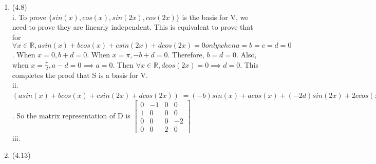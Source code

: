 \documentclass[letterpaper,12pt]{article}
\theoremstyle{definition}
\begin{document}
\begin{enumerate}
	\item(4.8)\\
	i. To prove $\{ sin(x), cos(x), sin(2x), cos(2x) \}$ is the basis for V, we need to prove they are linearly independent. This is equivalent to prove that for $\forall x \in \mathbb{R}, asin(x) + bcos(x) + csin(2x) + dcos(2x) = 0 only when a = b = c = d = 0 $. When $x=0, b + d = 0$. When $x = \pi, -b + d = 0$. Therefore, $b = d = 0$. Also, when $x = \frac{\pi}{2}, a-d = 0 \implies a = 0$. Then $\forall x \in \mathbb{R}, dcos(2x) = 0 \implies d = 0$. This completes the proof that S is a basis for V.\\
	ii. $(asin(x) +bcos(x) +csin(2x) +dcos(2x))^{'} = (-b)sin(x) + acos(x) +(-2d)sin(2x) + 2ccos(x)$. So the matrix representation of D is $\begin{bmatrix}
	   0 & -1 & 0 & 0 \\
	   1 & 0 & 0 & 0 \\
	   0 & 0 & 0 & -2 \\
	   0 & 0 & 2 & 0
	\end{bmatrix} $\\
	iii. \\

	\item(4.13)\\
	


\end{enumerate}

\vspace{25mm}
\end{document}
